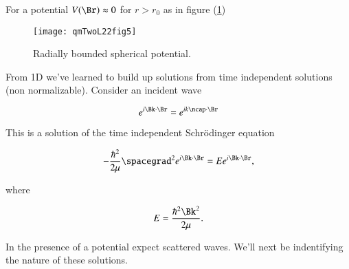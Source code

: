 For a potential $V(\Br) \approx 0$ for $r > r_0$ as in figure (\ref{fig:qmTwoL22:qmTwoL22fig5})

\begin{figure}[htp]
   \centering
   \texttt{[image: qmTwoL22fig5]}
   \caption{Radially bounded spherical potential.}\label{fig:qmTwoL22:qmTwoL22fig5}
\end{figure}

From 1D we've learned to build up solutions from time independent solutions (non normalizable).  Consider an incident wave

\begin{equation}\label{eqn:qmTwoL22:510}
e^{i \Bk \cdot \Br} = e^{i k \ncap \cdot \Br}
\end{equation}

This is a solution of the time independent Schr\"{o}dinger equation

\begin{equation}\label{eqn:qmTwoL22:530}
-\frac{\hbar^2}{2 \mu} \spacegrad^2 e^{i \Bk \cdot \Br} 
= E
e^{i \Bk \cdot \Br},
\end{equation}

where

\begin{equation}\label{eqn:qmTwoL22:550}
E = \frac{\hbar^2 \Bk^2}{2 \mu}.
\end{equation}

In the presence of a potential expect scattered waves.  We'll next be indentifying the nature of these solutions.

\EndArticle
